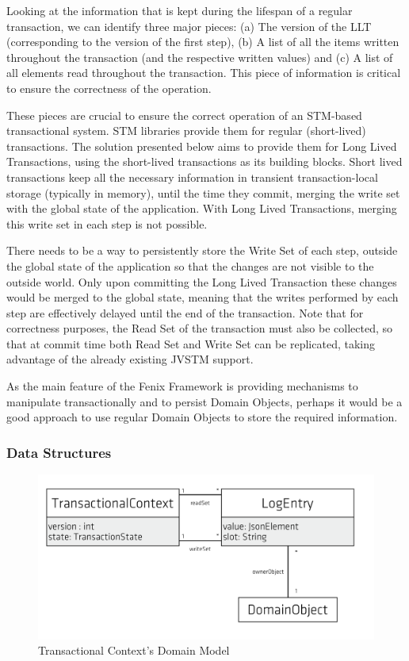 \documentclass{llncs}
\begin{document}
Looking at the information that is kept during the lifespan of a
regular transaction, we can identify three major pieces: (a) The
version of the LLT (corresponding to the version of the first step),
(b) A list of all the items written throughout the transaction (and
the respective written values) and (c) A list of all elements read
throughout the transaction. This piece of information is critical to
ensure the correctness of the operation.

These pieces are crucial to ensure the correct operation of an
STM-based transactional system. STM libraries provide them for regular
(short-lived) transactions. The solution presented below aims to
provide them for Long Lived Transactions, using the short-lived
transactions as its building blocks. Short lived transactions keep all
the necessary information in transient transaction-local storage
(typically in memory), until the time they commit, merging the write
set with the global state of the application. With Long Lived
Transactions, merging this write set in each step is not possible.

There needs to be a way to persistently store the Write Set of each
step, outside the global state of the application so that the changes
are not visible to the outside world. Only upon committing the Long
Lived Transaction these changes would be merged to the global state,
meaning that the writes performed by each step are effectively delayed
until the end of the transaction. Note that for correctness purposes,
the Read Set of the transaction must also be collected, so that at
commit time both Read Set and Write Set can be replicated, taking
advantage of the already existing JVSTM support.

As the main feature of the Fenix Framework is providing mechanisms to
manipulate transactionally and to persist Domain Objects, perhaps it
would be a good approach to use regular Domain Objects to store the
required information.

\subsubsection{Data Structures}

\begin{figure}
\centering
\includegraphics[width=0.5\linewidth]{tx-context}
\caption{Transactional Context's Domain Model}
\label{fig:transactionalContext}
\end{figure}
\end{document}
